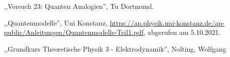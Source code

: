 \begin{thebibliography}{99}
,,Versuch 23: Quanten Analogien'', Tu Dortmund.

,,Quantenmodelle'', Uni Konstanz, \url{https://ap.physik.uni-konstanz.de/ap-public/Anleitungen/Quantenmodelle-Teil1.pdf}, abgerufen am 5.10.2021.

,,Grundkurs Theoretische Physik 3 - Elektrodynamik'', Nolting, Wolfgang


\end{thebibliography}